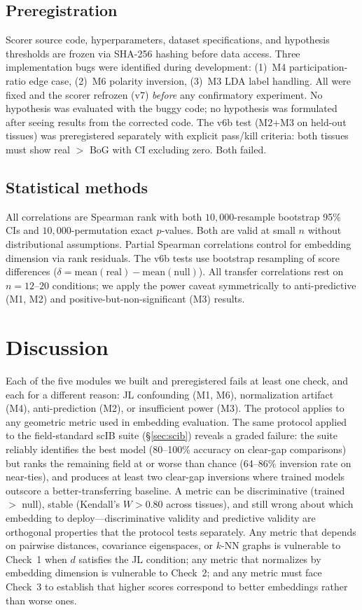 \documentclass[10pt,letterpaper]{article}
\begin{document}
\subsection{Preregistration}

Scorer source code, hyperparameters, dataset specifications, and hypothesis thresholds are frozen via SHA-256 hashing before data access. Three implementation bugs were identified during development: (1)~M4 participation-ratio edge case, (2)~M6 polarity inversion, (3)~M3 LDA label handling. All were fixed and the scorer refrozen (v7) \emph{before} any confirmatory experiment. No hypothesis was evaluated with the buggy code; no hypothesis was formulated after seeing results from the corrected code. The v6b test (M2+M3 on held-out tissues) was preregistered separately with explicit pass/kill criteria: both tissues must show real $>$ BoG with CI excluding zero. Both failed.

\subsection{Statistical methods}

All correlations are Spearman rank with both $10{,}000$-resample bootstrap 95\% CIs and $10{,}000$-permutation exact $p$-values. Both are valid at small $n$ without distributional assumptions. Partial Spearman correlations control for embedding dimension via rank residuals. The v6b tests use bootstrap resampling of score differences ($\delta = \text{mean}(\text{real}) - \text{mean}(\text{null})$). All transfer correlations rest on $n = 12$--$20$ conditions; we apply the power caveat symmetrically to anti-predictive (M1, M2) and positive-but-non-significant (M3) results.


\section{Discussion}

Each of the five modules we built and preregistered fails at least one check, and each for a different reason: JL confounding (M1, M6), normalization artifact (M4), anti-prediction (M2), or insufficient power (M3). The protocol applies to any geometric metric used in embedding evaluation. The same protocol applied to the field-standard scIB suite (\S\ref{sec:scib}) reveals a graded failure: the suite reliably identifies the best model (80--100\% accuracy on clear-gap comparisons) but ranks the remaining field at or worse than chance (64--86\% inversion rate on near-ties), and produces at least two clear-gap inversions where trained models outscore a better-transferring baseline. A metric can be discriminative (trained $>$ null), stable (Kendall's $W > 0.80$ across tissues), and still wrong about which embedding to deploy---discriminative validity and predictive validity are orthogonal properties that the protocol tests separately. Any metric that depends on pairwise distances, covariance eigenspaces, or $k$-NN graphs is vulnerable to Check~1 when $d$ satisfies the JL condition; any metric that normalizes by embedding dimension is vulnerable to Check~2; and any metric must face Check~3 to establish that higher scores correspond to better embeddings rather than worse ones.
\end{document}
